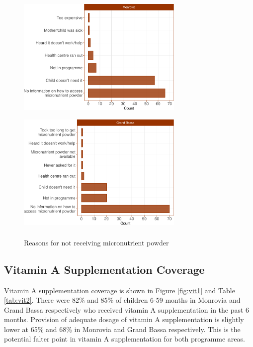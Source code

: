 \documentclass[12pt,a4paper]{article}
\theoremstyle{definition}
\theoremstyle{definition}
\theoremstyle{definition}
\theoremstyle{remark}
\begin{document}
\begin{figure}[H]

{\centering \includegraphics[width=8cm,height=6cm]{liberiaCoverageReport_files/figure-latex/mnp3a-1} \includegraphics[width=8cm,height=6cm]{liberiaCoverageReport_files/figure-latex/mnp3a-2} 

}

\caption{Reasons for not receiving micronutrient powder}\label{fig:mnp3a}
\end{figure}

\newpage

\hypertarget{vitamin-a-supplementation-coverage}{%
\subsection{Vitamin A Supplementation
Coverage}\label{vitamin-a-supplementation-coverage}}

Vitamin A supplementation coverage is shown in Figure \ref{fig:vit1} and
Table \ref{tab:vit2}. There were 82\% and 85\% of children 6-59 months
in Monrovia and Grand Bassa respectively who received vitamin A
supplementation in the past 6 months. Provision of adequate dosage of
vitamin A supplementation is slightly lower at 65\% and 68\% in Monrovia
and Grand Bassa respectively. This is the potential falter point in
vitamin A supplementation for both programme areas.
\end{document}
